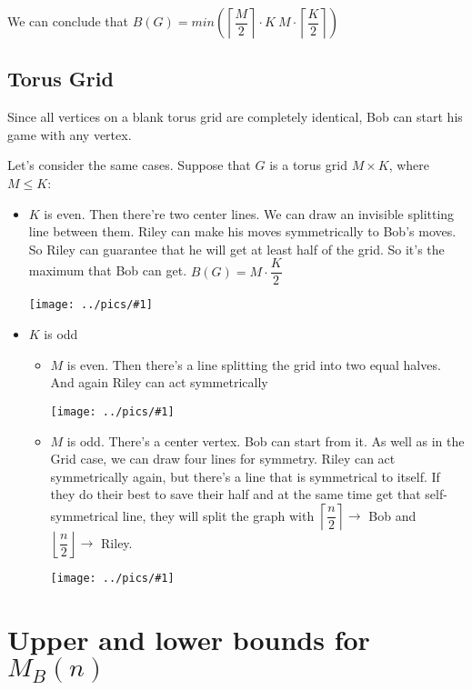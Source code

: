 \documentclass[12pt,a4paper, flushleft]{article}
\newcommand{\gr}[1]{\texttt{[image: ../pics/\#1]}}
\newcommand{\ceil}[1]{\left\lceil #1 \right\rceil}
\newcommand{\floor}[1]{\left\lfloor #1 \right\rfloor}
\begin{document}
	We can conclude that $B(G) = min\left( \ceil{\dfrac{M}{2}}\cdot K~M\cdot \ceil{\dfrac{K}{2}}\right)$
	
\subsection{Torus Grid}

Since all vertices on a blank torus grid are completely identical, Bob can start his game with any vertex.

Let's consider the same cases. Suppose that $G$ is a torus grid $M\times K$, where $M\leqslant K$:
\begin{itemize}
	\item $K$ is even. Then there're two center lines. We can draw an invisible splitting line between them. Riley can make his moves symmetrically to Bob's moves. So Riley can guarantee that he will get at least half of the grid. So it's the maximum that Bob can get. $B(G) = M\cdot \dfrac{K}{2}$
	
	\gr{1_3}
	\item $K$ is odd
	\begin{itemize}
		\item $M$ is even. Then there's a line splitting the grid into two equal halves. And again Riley can act symmetrically
		
		\gr{1_31}
		\item $M$ is odd. There's a center vertex. Bob can start from it. As well as in the Grid case, we can draw four lines for symmetry.
		Riley can act symmetrically again, but there's a line that is symmetrical to itself. If they do their best to save their half and at the same time get that self-symmetrical line, they will split the graph with $\ceil{\dfrac{n}{2}}\to$ Bob and $\floor{\dfrac{n}{2}}\to$ Riley.
		
		\gr{b} 
	\end{itemize}
\end{itemize}  

\section{Upper and lower bounds for $M	_B(n)$}
\end{document}
